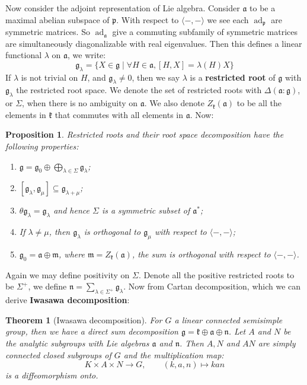 \documentclass[11pt]{report}
\theoremstyle{definition}
\theoremstyle{plain}
\newtheorem{Prop}[Def]{Proposition}
\newtheorem{Theo}[Def]{Theorem}
\DeclareMathOperator{\ad}{ad}
\newcommand{\brac}[1]{\langle #1 \rangle}
\newcommand{\Lie}[1]{\mathfrak{#1}}
\begin{document}
\par Now consider the adjoint representation of Lie algebra. Consider $\Lie{a}$ to be a maximal abelian subspace of $\Lie{p}$. With respect to $\brac{-,-}$ we see each $\ad_{\Lie{p}}$ are symmetric matrices. So $\ad_{\Lie{a}}$ give a commuting subfamily of symmetric matrices are simultaneously diagonalizable with real eigenvalues. Then this defines a linear functional $\lambda$ on $\Lie{a}$, we write:
\begin{equation}
\Lie{g}_{\lambda}=\{X\in \Lie{g}\mid \forall H\in \Lie{a},{} [H, X]=\lambda(H)X \}
\end{equation}
If $\lambda$ is not trivial on $H$, and $\Lie{g}_\lambda\neq 0$, then we say $\lambda$ is a \textbf{restricted root} of $\Lie{g}$ with $\Lie{g}_\lambda$ the restricted root space. We denote the set of restricted roots with $\Delta(\Lie{a}: \Lie{g})$, or $\Sigma$, when there is no ambiguity on $\Lie{a}$. We also denote $Z_{\Lie{k}}(\Lie{a})$ to be all the elements in $\Lie{k}$ that commutes with all elements in $\Lie{a}$. Now:
\begin{Prop}\label{knapp5.9}
	\textnormal{\cite[Proposition~5.9]{knapp2016}} Restricted roots and their root space decomposition have the following properties:
	\begin{enumerate}
		\item $\Lie{g}=\Lie{g}_0\oplus \bigoplus_{\lambda\in \Sigma}\Lie{g}_\lambda$;
		\item $[\Lie{g}_\lambda, \Lie{g}_\mu]\subseteq \Lie{g}_{\lambda+\mu}$;
		\item $\theta \Lie{g}_\lambda=\Lie{g}_\lambda$ and hence $\Sigma$ is a symmetric subset of $\Lie{a}^*$;
		\item If $\lambda\neq \mu$, then $\Lie{g}_\lambda$ is orthogonal to $\Lie{g}_\mu$ with respect to $\brac{-,-}$;
		\item $\Lie{g}_0=\Lie{a}\oplus \Lie{m}$, where $\Lie{m}=Z_{\Lie{k}}(\Lie{a})$, the sum is orthogonal with respect to $\brac{-,-}$.
	\end{enumerate}
\end{Prop}
Again we may define positivity on $\Sigma$. Denote all the positive restricted roots to be $\Sigma^+$, we define $\Lie{n}=\sum_{\lambda\in \Sigma^+}\Lie{g}_{\lambda}$. Now from Cartan decomposition, which we can derive \textbf{Iwasawa decomposition}:
\begin{Theo}[Iwasawa decomposition]
	\textnormal{\cite[Theorem~5.12]{knapp2016}} For $G$ a linear connected semisimple group, then we have a direct sum decomposition $\Lie{g}=\Lie{k}\oplus \Lie{a}\oplus \Lie{n}$. Let $A$ and $N$ be the analytic subgroups with Lie algebras $\Lie{a}$ and $\Lie{n}$. Then $A, N$ and $AN$ are simply connected closed subgroups of $G$  and the multiplication map:
	\begin{equation*}
	K\times A\times N\to G, \qquad (k,a,n)\mapsto kan
	\end{equation*}
	is a diffeomorphism onto.
\end{Theo}
\end{document}
